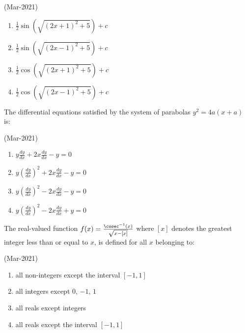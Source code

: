 	\hfill{(Mar-2021)}
	\begin{multicols}{2}
               \begin{enumerate}
    \item $ \frac{1}{2} \sin\left(\sqrt{(2x + 1)^2 + 5}\right) + c $
    \item $ \frac{1}{2} \sin\left(\sqrt{(2x - 1)^2 + 5}\right) + c $
    \item $ \frac{1}{2} \cos\left(\sqrt{(2x + 1)^2 + 5}\right) + c $
    \item $ \frac{1}{2} \cos\left(\sqrt{(2x - 1)^2 + 5}\right) + c $
               \end{enumerate}
	\end{multicols}
       \item
	       The differential equations satisfied by the system of parabolas $ y^2 = 4a(x + a)$ is:

	       	\hfill{(Mar-2021)}
		\begin{multicols}{2}
	       \begin{enumerate}
    \item $ y \frac{dy}{dx} + 2x \frac{dy}{dx} - y = 0 $
    \item $ y \left(\frac{dy}{dx}\right)^2 + 2x \frac{dy}{dx} - y = 0 $
    \item $ y \left(\frac{dy}{dx}\right)^2 - 2x \frac{dy}{dx} - y = 0 $
    \item $ y \left(\frac{dy}{dx}\right)^2 - 2x \frac{dy}{dx} + y = 0 $
               \end{enumerate}
		\end{multicols}
       \item
	       The real-valued function $ f(x) = \frac{\cosec^{-1}(x)}{\sqrt{x - [x]}}$ where $[x]$ denotes the greatest integer less than or equal to $x$, is defined for all $x$ belonging to:

	       	\hfill{(Mar-2021)}
		\begin{multicols}{1}
	       \begin{enumerate}
    \item all non-integers except the interval $[-1, 1]$
    \item all integers except $0$, $-1$, $1$
    \item all reals except integers
    \item all reals except the interval $[-1, 1]$
               \end{enumerate}
		\end{multicols}
